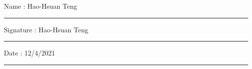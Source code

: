 \documentclass[11pt,oneside]{book}
\begin{document}
\noindent Name : Hao-Hsuan Teng\\[1mm]
\rule[1em]{25em}{0.5pt}

\noindent Signature : Hao-Hsuan Teng\\[1mm]
\rule[1em]{25em}{0.5pt}

\noindent Date : 12/4/2021\\[1mm]
\rule[1em]{25em}{0.5pt}





\tableofcontents
\listoffigures 
{} 

\mainmatter



%
%
%

 
 
\end{document}
